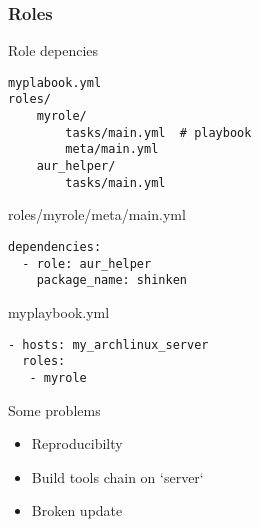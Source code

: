 \documentclass{beamer}
\begin{document}
\begin{frame}[fragile]
\frametitle{Roles}
    \footnotesize{
    \begin{block}{Role depencies}
        \begin{verbatim}
myplabook.yml
roles/
    myrole/
        tasks/main.yml  # playbook
        meta/main.yml
    aur_helper/
        tasks/main.yml
        \end{verbatim}
    \end{block}


    \begin{block}{roles/myrole/meta/main.yml}
        \begin{verbatim}
dependencies:
  - role: aur_helper
    package_name: shinken
        \end{verbatim}
    \end{block}

    \begin{block}{myplaybook.yml}
        \begin{verbatim}
- hosts: my_archlinux_server
  roles:
   - myrole
        \end{verbatim}
    \end{block}
    }
\end{frame}



\begin{frame}
    \begin{alertblock}{Some problems}
        \begin{itemize}
            \item Reproducibilty
            \item Build tools chain on `server`
            \item Broken update
        \end{itemize}
    \end{alertblock}

    \vfill

\end{frame}

\begin{frame}
\end{frame}
\end{document}

